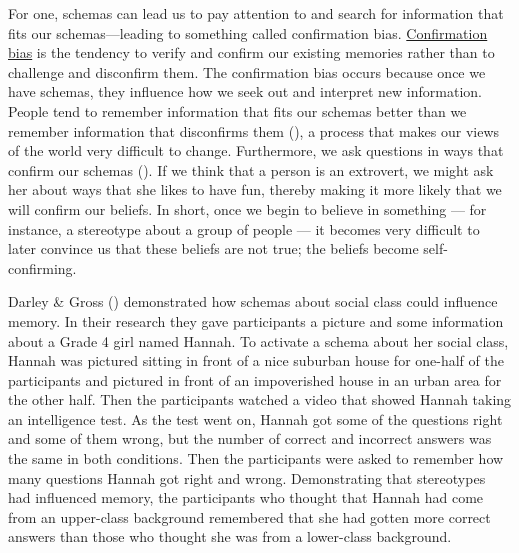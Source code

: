 \documentclass[
]{krantz}
\begin{document}
For one, schemas can lead us to pay attention to and search for information that fits our schemas---leading to something called confirmation bias. \hyperref[confirmation-bias]{Confirmation bias} is the tendency to verify and confirm our existing memories rather than to challenge and disconfirm them. The confirmation bias occurs because once we have schemas, they influence how we seek out and interpret new information. People tend to remember information that fits our schemas better than we remember information that disconfirms them (), a process that makes our views of the world very difficult to change. Furthermore, we ask questions in ways that confirm our schemas (). If we think that a person is an extrovert, we might ask her about ways that she likes to have fun, thereby making it more likely that we will confirm our beliefs. In short, once we begin to believe in something --- for instance, a stereotype about a group of people --- it becomes very difficult to later convince us that these beliefs are not true; the beliefs become self-confirming.

Darley \& Gross () demonstrated how schemas about social class could influence memory. In their research they gave participants a picture and some information about a Grade 4 girl named Hannah. To activate a schema about her social class, Hannah was pictured sitting in front of a nice suburban house for one-half of the participants and pictured in front of an impoverished house in an urban area for the other half. Then the participants watched a video that showed Hannah taking an intelligence test. As the test went on, Hannah got some of the questions right and some of them wrong, but the number of correct and incorrect answers was the same in both conditions. Then the participants were asked to remember how many questions Hannah got right and wrong. Demonstrating that stereotypes had influenced memory, the participants who thought that Hannah had come from an upper-class background remembered that she had gotten more correct answers than those who thought she was from a lower-class background.
\end{document}
